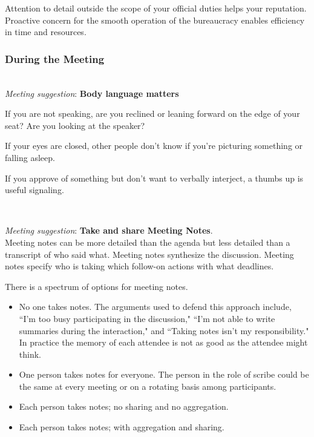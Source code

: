 Attention to detail outside the scope of your official duties helps your reputation. Proactive concern for the smooth operation of the bureaucracy enables efficiency in time and resources.



\subsubsection*{During the Meeting}

\ \\
\textit{Meeting suggestion}: \textbf{Body language matters}

If you are not speaking, are you reclined or leaning forward on the edge of your seat? Are you looking at the speaker?

If your eyes are closed, other people don't know if you're picturing something or falling asleep. 

If you approve of something but don't want to verbally interject, a thumbs up is useful signaling. 

\ \\
\begin{samepage}
\textit{Meeting suggestion}: \textbf{Take and share Meeting Notes}.\\
Meeting notes can be more detailed than the agenda but less detailed than a transcript of who said what. Meeting notes synthesize the discussion. Meeting notes specify who is taking which follow-on actions with what deadlines. 
\end{samepage}

There is a spectrum of options for meeting notes. 
\begin{itemize}
    \item No one takes notes. The arguments used to defend this approach include, ``I'm too busy participating in the discussion," ``I'm not able to write summaries during the interaction," and ``Taking notes isn't my responsibility." In practice the memory of each attendee is not as good as the attendee might think.
    \item One person takes notes for everyone. The person in the role of scribe could be the same at every meeting or on a rotating basis among participants.
    \item Each person takes notes; no sharing and no aggregation.
    \item Each person takes notes; with aggregation and sharing.
\end{itemize}

